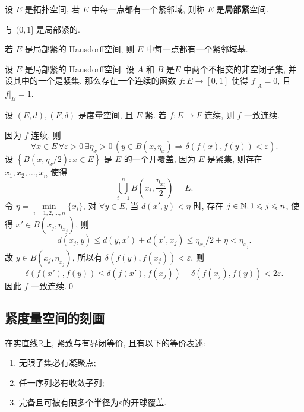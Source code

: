 \begin{Definition}[局部紧]\label{def:局部紧}
	设 $ E $ 是拓扑空间, 若 $ E $ 中每一点都有一个紧邻域, 则称 $ E $ 是\textbf{局部紧}空间.
\end{Definition}

\begin{Example}
	\R 与 $ (0, 1] $ 是局部紧的.
\end{Example}

\begin{Remark}
	若 $ E $ 是局部紧的 Hausdorff空间, 则 $ E $ 中每一点都有一个紧邻域基.
\end{Remark}

\begin{Theorem}[Urysohn引理]
	设 $ E $ 是局部紧的 Hausdorff空间. 设 $ A $ 和 $ B $ 是$ E $ 中两个不相交的非空闭子集, 并设其中的一个是紧集, 那么存在一个连续的函数 $ f:E\to[0,1] $ 使得 $ f|_{A}=0 $, 且 $ f|_{B}=1 $.
\end{Theorem}

\begin{Theorem}
	设 $ (E, d), (F, \delta) $ 是度量空间, 且 $ E $ 紧. 若 $ f:E\to F $ 连续, 则 $ f $ 一致连续.
\end{Theorem}

\begin{Proof}
	因为 $ f $ 连续, 则
	\[
		\forall x\in E\,\forall \varepsilon>0\,\exists\eta_{x}>0\,(y\in B(x, \eta_{x})\Rightarrow \delta(f(x), f(y))<\varepsilon).
	\]
	设 $\left\{ B(x, \eta_{x}/2) : x\in E \right\}$ 是 $ E $ 的一个开覆盖, 因为 $ E $ 是紧集, 则存在 $ x_{1}, x_{2},\dots,x_{n} $ 使得
	\[
		\bigcup_{i=1}^{n} B\left(x_{i}, \frac{\eta_{x_{i}}}{2}\right)=E.
	\]
	令 $ \eta=\min\limits_{i=1, 2, \dots, n}\{ x_{i} \} $, 对 $ \forall y\in E $, 当 $ d(x', y)<\eta $ 时, 存在 $ j\in\mathbb{N}, 1\leqslant j\leqslant n $, 使得 $ x'\in B(x_{j}, \eta_{x_{j}}) $, 则
	\[
		d(x_{j}, y) \leqslant d(y, x')+d(x', x_{j})\leqslant\eta_{x_{j}}/2+\eta<\eta_{x_{j}}.
	\]
	故 $ y\in B(x_{j}, \eta_{x_{j}}) $, 所以有 $ \delta(f(y), f(x_{j}))<\varepsilon $, 则
	\[
		\delta(f(x'), f(y))\leqslant \delta(f(x'), f(x_{j}))+\delta(f(x_{j}), f(y))<2\varepsilon.
	\]
	因此 $ f $ 一致连续.\qed
\end{Proof}

\subsection{紧度量空间的刻画}

\begin{Example}
	在实直线$ \mathbb{R} $上, 紧致与有界闭等价, 且有以下的等价表述:
	\begin{enumerate}[(1)]
		\item 无限子集必有凝聚点;
		\item 任一序列必有收敛子列;
		\item 完备且可被有限多个半径为$ \varepsilon $的开球覆盖.
	\end{enumerate}
\end{Example}

